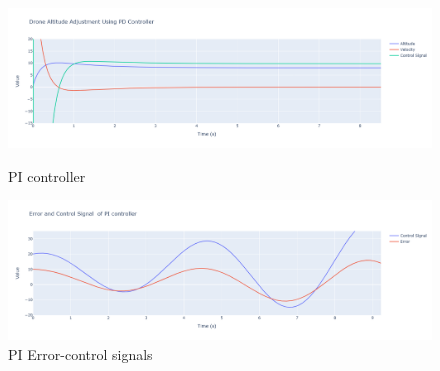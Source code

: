 \documentclass[a4paper,12pt]{article}
\begin{document}
\begin{figure}
    \centering
    \includegraphics[width=1\linewidth,height=0.6
    \linewidth]{photos/pd.png}
    \caption{PI controller}
    \label{fig:enter-label}
    \centering
    \includegraphics[width=1\linewidth,height=0.6
    \linewidth]{photos/pi_error.png}
    \caption{PI Error-control signals}
    \label{fig:enter-label}
    
    
    
\end{figure}
\end{document}
